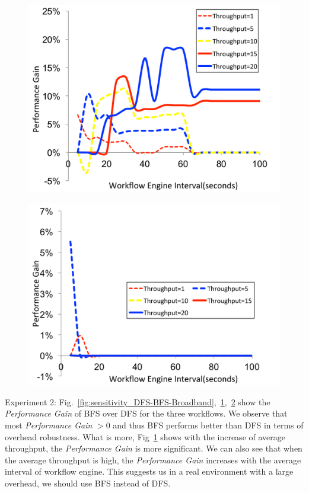 \begin{figure}[!htb]
\centering
 \includegraphics[width=0.9\linewidth]{figures/sensitivity/DFS-BFS-CyberShake.pdf}
  \label{fig:sensitivity_DFS-BFS-CyberShake}
\end{figure}

\begin{figure}[!htb]
\centering
 \includegraphics[width=0.9\linewidth]{figures/sensitivity/DFS-BFS-Montage.pdf}
  \label{fig:sensitivity_DFS-BFS-Montage}
\end{figure}


Experiment 2: Fig.~\ref{fig:sensitivity_DFS-BFS-Broadband},~\ref{fig:sensitivity_DFS-BFS-CyberShake},~\ref{fig:sensitivity_DFS-BFS-Montage} show the \emph{Performance Gain} of BFS over DFS for the three workflows. We observe that most  \emph{Performance Gain} $>0$ and thus BFS performs better than DFS in terms of overhead robustness. What is more, Fig~\ref{fig:sensitivity_DFS-BFS-CyberShake} shows with the increase of average throughput, the \emph{Performance Gain} is more significant. We can also see that when the average throughput is high, the \emph{Performance Gain} increases with the average interval of workflow engine. This suggests us in a real environment with a large overhead, we should use BFS instead of DFS. 


